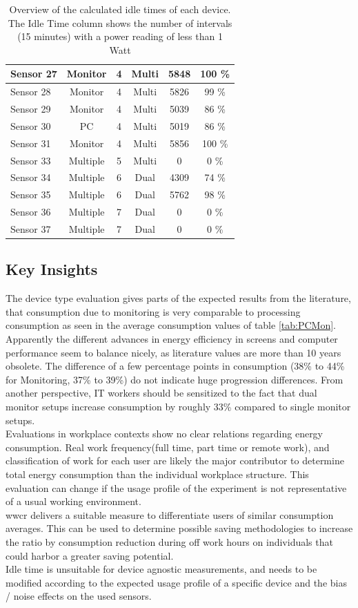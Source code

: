 \begin{table}[ht]
\begin{tabular}{|l|c|c|c|c|c|}
		\hline%
		Sensor 27&Monitor&4&Multi&5848&100 \%\\%
		\hline%
		Sensor 28&Monitor&4&Multi&5826&99 \%\\%
		\hline%
		Sensor 29&Monitor&4&Multi&5039&86 \%\\%
		\hline%
		Sensor 30&PC&4&Multi&5019&86 \%\\%
		\hline%
		Sensor 31&Monitor&4&Multi&5856&100 \%\\%
		\hline%
		Sensor 33&Multiple&5&Multi&0&0 \%\\%
		\hline%
		Sensor 34&Multiple&6&Dual&4309&74 \%\\%
		\hline%
		Sensor 35&Multiple&6&Dual&5762& 98 \%\\%
		\hline%
		Sensor 36&Multiple&7&Dual&0&0 \%\\%
		\hline%
		Sensor 37&Multiple&7&Dual&0&0 \%\\%
		\hline%
	\end{tabular}
	\caption{Overview of the calculated idle times of each device. The Idle Time column shows the number of intervals (15 minutes) with a power reading of less than 1 Watt}
	\label{tab:idle}
\end{table} 

\subsection{Key Insights}\label{subsec:insights}
The device type evaluation gives parts of the expected results from the literature\cite{min-energy}, that consumption due to monitoring is very comparable to processing consumption as seen in the average consumption values of table \ref{tab:PCMon}. Apparently the different advances in energy efficiency in screens and computer performance seem to balance nicely, as literature values are more than 10 years obsolete. The difference of a few percentage points in consumption (38\% to 44\% for Monitoring, 37\% to 39\%) do not indicate huge progression differences. From another perspective, IT workers should be sensitized to the fact that dual monitor setups increase consumption by roughly 33\% compared to single monitor setups.\\
Evaluations in workplace contexts show no clear relations regarding energy consumption. Real work frequency(full time, part time or remote work), and classification of work for each user are likely the major contributor to determine total energy consumption than the individual workplace structure. This evaluation can change if the usage profile of the experiment is not representative of a usual working environment.\\
\acrfull{wwcr} delivers a suitable measure to differentiate users of similar consumption averages. This can be used to determine possible saving methodologies to increase the ratio by consumption reduction during off work hours on individuals that could harbor a greater saving potential.\\
Idle time is unsuitable for device agnostic measurements, and needs to be modified according to the expected usage profile of a specific device and the bias / noise effects on the used sensors.

